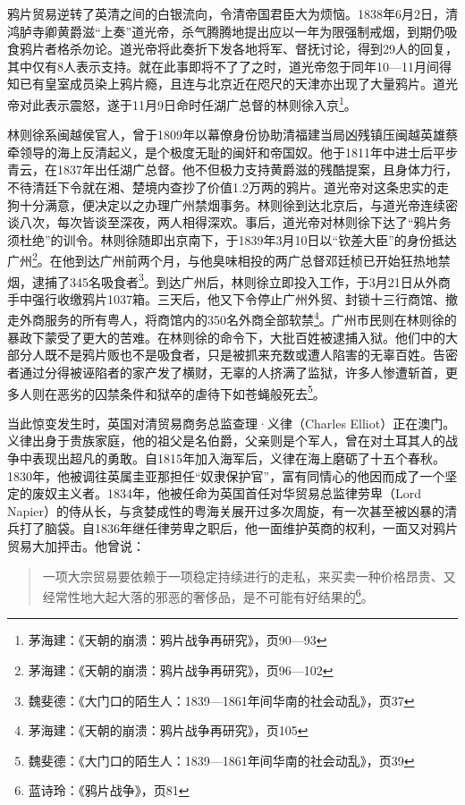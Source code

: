 鸦片贸易逆转了英清之间的白银流向，令清帝国君臣大为烦恼。1838年6月2日，清鸿胪寺卿黄爵滋“上奏”道光帝，杀气腾腾地提出应以一年为限强制戒烟，到期仍吸食鸦片者格杀勿论。道光帝将此奏折下发各地将军、督抚讨论，得到29人的回复，其中仅有8人表示支持。就在此事即将不了了之时，道光帝忽于同年10—11月间得知已有皇室成员染上鸦片瘾，且连与北京近在咫尺的天津亦出现了大量鸦片。道光帝对此表示震怒，遂于11月9日命时任湖广总督的林则徐入京\footnote{茅海建：《天朝的崩溃：鸦片战争再研究》，页90—93}。

林则徐系闽越侯官人，曾于1809年以幕僚身份协助清福建当局凶残镇压闽越英雄蔡牵领导的海上反清起义，是个极度无耻的闽奸和帝国奴。他于1811年中进士后平步青云，在1837年出任湖广总督。他不但极力支持黄爵滋的残酷提案，且身体力行，不待清廷下令就在湘、楚境内查抄了价值1.2万两的鸦片。道光帝对这条忠实的走狗十分满意，便决定以之办理广州禁烟事务。林则徐到达北京后，与道光帝连续密谈八次，每次皆谈至深夜，两人相得深欢。事后，道光帝对林则徐下达了“鸦片务须杜绝”的训令。林则徐随即出京南下，于1839年3月10日以“钦差大臣”的身份抵达广州\footnote{茅海建：《天朝的崩溃：鸦片战争再研究》，页96—102}。在他到达广州前两个月，与他臭味相投的两广总督邓廷桢已开始狂热地禁烟，逮捕了345名吸食者\footnote{魏斐德：《大门口的陌生人：1839—1861年间华南的社会动乱》，页37}。到达广州后，林则徐立即投入工作，于3月21日从外商手中强行收缴鸦片1037箱。三天后，他又下令停止广州外贸、封锁十三行商馆、撤走外商服务的所有粤人，将商馆内的350名外商全部软禁\footnote{茅海建：《天朝的崩溃：鸦片战争再研究》，页105}。广州市民则在林则徐的暴政下蒙受了更大的苦难。在林则徐的命令下，大批百姓被逮捕入狱。他们中的大部分人既不是鸦片贩也不是吸食者，只是被抓来充数或遭人陷害的无辜百姓。告密者通过分得被诬陷者的家产发了横财，无辜的人挤满了监狱，许多人惨遭斩首，更多人则在恶劣的囚禁条件和狱卒的虐待下如苍蝇般死去\footnote{魏斐德：《大门口的陌生人：1839—1861年间华南的社会动乱》，页39}。

当此惊变发生时，英国对清贸易商务总监查理·义律（Charles Elliot）正在澳门。义律出身于贵族家庭，他的祖父是名伯爵，父亲则是个军人，曾在对土耳其人的战争中表现出超凡的勇敢。自1815年加入海军后，义律在海上磨砺了十五个春秋。1830年，他被调往英属圭亚那担任“奴隶保护官”，富有同情心的他因而成了一个坚定的废奴主义者。1834年，他被任命为英国首任对华贸易总监律劳卑（Lord Napier）的侍从长，与贪婪成性的粤海关展开过多次周旋，有一次甚至被凶暴的清兵打了脑袋。自1836年继任律劳卑之职后，他一面维护英商的权利，一面又对鸦片贸易大加抨击。他曾说：

\begin{quote}

一项大宗贸易要依赖于一项稳定持续进行的走私，来买卖一种价格昂贵、又经常性地大起大落的邪恶的奢侈品，是不可能有好结果的\footnote{蓝诗玲：《鸦片战争》，页81}。

\end{quote}

